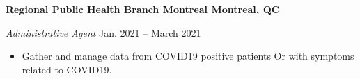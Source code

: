\textbf{Regional Public Health Branch Montreal \hfill  Montreal, QC} \par
\textit{Administrative Agent} \hfill Jan. 2021 -- March 2021 \par
\begin{itemize}
	\item Gather and manage data from COVID19 positive patients Or with symptoms related to COVID19.
\end{itemize} \par